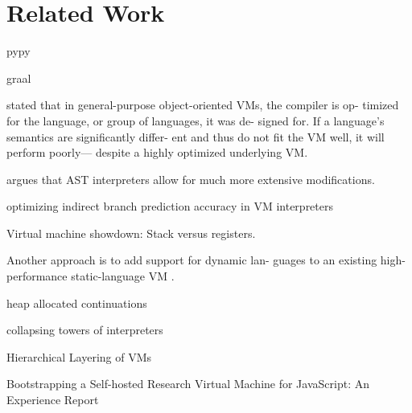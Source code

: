 \newpage

\section{Related Work}
\label{sec:related}


pypy \cite{rpython07}

graal \cite{graal:13}

\cite{bolz15-meta-vm} stated that in general-purpose object-oriented
VMs, the compiler is op- timized for the language, or group of
languages, it was de- signed for. If a language’s semantics are
significantly differ- ent and thus do not fit the VM well, it will
perform poorly— despite a highly optimized underlying VM.


\cite{ast:12} argues that AST interpreters allow for much more
extensive modifications.

\cite{branch-predict:03} optimizing indirect branch prediction accuracy in VM interpreters

Virtual machine showdown: Stack versus registers.

Another approach is to add support for dynamic lan- guages to an
existing high-performance static-language VM \cite{stJITdyn:12,
  dynStatComp:12}.

heap allocated continuations \cite{whatever:19, compWithContLLVM:16}

collapsing towers of interpreters \cite{collapse:17}

Hierarchical Layering of VMs \cite{layering:09}

Bootstrapping a Self-hosted Research Virtual Machine for JavaScript:
An Experience Report \cite{self-hostJSvm:11}







